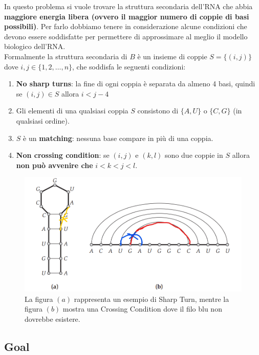 In questo problema si vuole trovare la struttura secondaria dell'RNA che
abbia \textbf{maggiore energia libera (ovvero il maggior numero di
  coppie di basi possibili)}. Per farlo dobbiamo tenere in considerazione
alcune condizioni che devono essere soddisfatte per permettere di
approssimare al meglio il modello biologico dell'RNA.\\

Formalmente la struttura secondaria di $B$ è un insieme di coppie
$S = \{(i,j)\}$ dove $i,j \in \{1,2,\ldots,n\}$, che soddisfa le
seguenti condizioni:

\begin{enumerate}
  \def\labelenumi{\arabic{enumi}.}
  \item
        \textbf{No sharp turns}: la fine di ogni coppia è separata da almeno 4
        basi, quindi se $(i,j) \in S$ allora $i < j - 4$
  \item
        Gli elementi di una qualsiasi coppia $S$ consistono di $\{A, U\}$
        o $\{C, G\}$ (in qualsiasi ordine).
  \item
        $S$ è un \textbf{matching}: nessuna base compare in più di una
        coppia.
  \item
        \textbf{Non crossing condition}: se $(i, j)$ e $(k,l)$ sono due
        coppie in $S$ allora \textbf{non può avvenire che}
        $i < k < j < l$.
\end{enumerate}

\begin{figure}[H]
  \includegraphics[width=15cm, keepaspectratio]{Programmazione_dinamica/imgs/rna2.png}
  \centering
  \caption{La figura $(a)$ rappresenta un esempio di Sharp Turn, mentre la
    figura $(b)$ mostra una Crossing Condition dove il filo blu non dovrebbe
    esistere.}
\end{figure}

\subsection{Goal}

